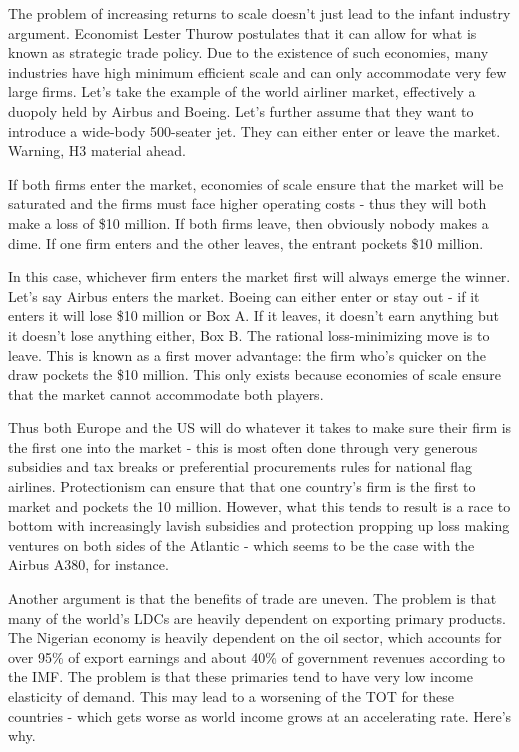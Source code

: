 The problem of increasing returns to scale doesn't just lead to the infant industry argument. Economist Lester Thurow postulates that it can allow for what is known as strategic trade policy. Due to the existence of such economies, many industries have high minimum efficient scale and can only accommodate very few large firms. Let's take the example of the world airliner market, effectively a duopoly held by Airbus and Boeing. Let's further assume that they want to introduce a wide-body 500-seater jet. They can either enter or leave the market. Warning, H3 material ahead.

If both firms enter the market, economies of scale ensure that the market will be saturated and the firms must face higher operating costs - thus they will both make a loss of \$10 million. If both firms leave, then obviously nobody makes a dime. If one firm enters and the other leaves, the entrant pockets \$10 million.

In this case, whichever firm enters the market first will always emerge the winner. Let's say Airbus enters the market. Boeing can either enter or stay out - if it enters it will lose \$10 million or Box A. If it leaves, it doesn't earn anything but it doesn't lose anything either, Box B. The rational loss-minimizing move is to leave. This is known as a first mover advantage: the firm who's quicker on the draw pockets the \$10 million. This only exists because economies of scale ensure that the market cannot accommodate both players.

Thus both Europe and the US will do whatever it takes to make sure their firm is the first one into the market - this is most often done through very generous subsidies and tax breaks or preferential procurements rules for national flag airlines. Protectionism can ensure that that one country's firm is the first to market and pockets the 10 million. However, what this tends to result is a race to bottom with increasingly lavish subsidies and protection propping up loss making ventures on both sides of the Atlantic - which seems to be the case with the Airbus A380, for instance.

Another argument is that the benefits of trade are uneven. The problem is that many of the world's LDCs are heavily dependent on exporting primary products. The Nigerian economy is heavily dependent on the oil sector, which accounts for over 95\% of export earnings and about 40\% of government revenues according to the IMF. The problem is that these primaries tend to have very low income elasticity of demand. This may lead to a worsening of the TOT for these countries - which gets worse as world income grows at an accelerating rate. Here's why.


